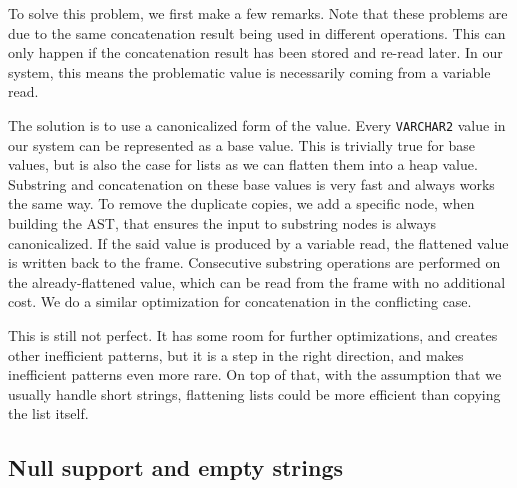 \documentclass[twoside,11pt,a4paper]{article}
\newcommand{\pls}[1]{\small\texttt{#1}\normalsize}
\newcommand{\plstype}[1]{\pls{#1}}
\newcommand{\varchar}{\plstype{VARCHAR2}}
\begin{document}
To solve this problem, we first make a few remarks. Note that these problems are due to the same concatenation result being used in different operations. This can only happen if the concatenation result has been stored and re-read later. In our system, this means the problematic value is necessarily coming from a variable read.

The solution is to use a canonicalized form of the value. Every \varchar{} value in our system can be represented as a base value. This is trivially true for base values, but is also the case for lists as we can flatten them into a heap value. Substring and concatenation on these base values is very fast and always works the same way. To remove the duplicate copies, we add a specific node, when building the AST, that ensures the input to substring nodes is always canonicalized. If the said value is produced by a variable read, the flattened value is written back to the frame. Consecutive substring operations are performed on the already-flattened value, which can be read from the frame with no additional cost. We do a similar optimization for concatenation in the conflicting case.

This is still not perfect. It has some room for further optimizations, and creates other inefficient patterns, but it is a step in the right direction, and makes inefficient patterns even more rare. On top of that, with the assumption that we usually handle short strings, flattening lists could be more efficient than copying the list itself.

\subsection{Null support and empty strings}

\end{document}
